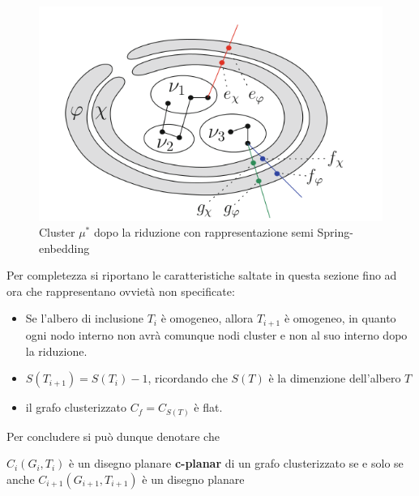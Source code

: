{\begin{figure}[!htb]
	\begin{center}
		\includegraphics[width=1.1 \linewidth]{figure/flatSpring}
	\end{center}
	\caption{Cluster $\mu^*$ dopo la riduzione con rappresentazione semi Spring-enbedding \label{fig:flatSpring}}
\end{figure}
\newline
Per completezza si riportano le caratteristiche saltate in questa sezione fino ad ora che rappresentano ovvietà non specificate:
\begin{itemize}
	\item Se l'albero di inclusione $T_i$ è omogeneo, allora $T_{i + 1}$ è omogeneo, in quanto ogni nodo interno non avrà comunque nodi cluster e non al suo interno dopo la riduzione.
	\item $S(T_{i+1})= S(T_i)-1$, ricordando che $S(T)$ è la dimenzione dell'albero $T$
	\item il grafo clusterizzato $C_f = C_{S(T)}$ è flat.
\end{itemize} 
Per concludere si può dunque denotare che\\ 
\begin{center}
	$C_i(G_i , T_i )$ è un disegno planare \textbf{c-planar} di un grafo clusterizzato se e solo se anche $C_{i+1}(G_{i+1} , T_{i+1} )$ è un disegno planare 
\end{center}
}
